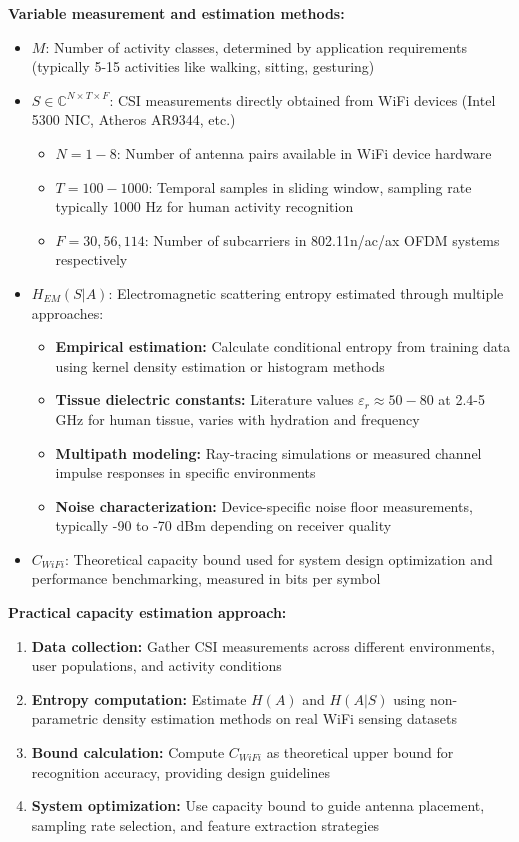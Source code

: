 \documentclass[12pt,a4paper]{article}
\begin{document}
\textbf{Variable measurement and estimation methods:}
\begin{itemize}
\item $M$: Number of activity classes, determined by application requirements (typically 5-15 activities like walking, sitting, gesturing)
\item $S \in \mathbb{C}^{N \times T \times F}$: CSI measurements directly obtained from WiFi devices (Intel 5300 NIC, Atheros AR9344, etc.)
\begin{itemize}
\item $N = 1-8$: Number of antenna pairs available in WiFi device hardware
\item $T = 100-1000$: Temporal samples in sliding window, sampling rate typically 1000 Hz for human activity recognition
\item $F = 30, 56, 114$: Number of subcarriers in 802.11n/ac/ax OFDM systems respectively
\end{itemize}
\item $H_{EM}(S|A)$: Electromagnetic scattering entropy estimated through multiple approaches:
\begin{itemize}
\item \textbf{Empirical estimation:} Calculate conditional entropy from training data using kernel density estimation or histogram methods
\item \textbf{Tissue dielectric constants:} Literature values $\varepsilon_r \approx 50-80$ at 2.4-5 GHz for human tissue, varies with hydration and frequency
\item \textbf{Multipath modeling:} Ray-tracing simulations or measured channel impulse responses in specific environments
\item \textbf{Noise characterization:} Device-specific noise floor measurements, typically -90 to -70 dBm depending on receiver quality
\end{itemize}
\item $C_{WiFi}$: Theoretical capacity bound used for system design optimization and performance benchmarking, measured in bits per symbol
\end{itemize}

\textbf{Practical capacity estimation approach:}
\begin{enumerate}
\item \textbf{Data collection:} Gather CSI measurements across different environments, user populations, and activity conditions
\item \textbf{Entropy computation:} Estimate $H(A)$ and $H(A|S)$ using non-parametric density estimation methods on real WiFi sensing datasets
\item \textbf{Bound calculation:} Compute $C_{WiFi}$ as theoretical upper bound for recognition accuracy, providing design guidelines
\item \textbf{System optimization:} Use capacity bound to guide antenna placement, sampling rate selection, and feature extraction strategies
\end{enumerate}
\end{document}
